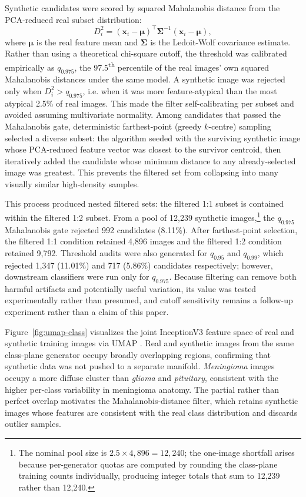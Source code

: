 \documentclass[conference,twoside]{IEEEtran}
\begin{document}
Synthetic candidates were scored by squared Mahalanobis distance from the PCA-reduced real subset distribution:
\begin{equation}
  D^2_i = (\mathbf{x}_i - \boldsymbol{\mu})^\top \boldsymbol{\Sigma}^{-1} (\mathbf{x}_i - \boldsymbol{\mu}),
\end{equation}
where $\boldsymbol{\mu}$ is the real feature mean and $\boldsymbol{\Sigma}$ is the Ledoit-Wolf covariance estimate. Rather than using a theoretical chi-square cutoff, the threshold was calibrated empirically as $q_{0.975}$, the 97.5\textsuperscript{th} percentile of the real images' own squared Mahalanobis distances under the same model. A synthetic image was rejected only when $D_i^2>q_{0.975}$, i.e. when it was more feature-atypical than the most atypical 2.5\% of real images. This made the filter self-calibrating per subset and avoided assuming multivariate normality. Among candidates that passed the Mahalanobis gate, deterministic farthest-point (greedy $k$-centre) sampling selected a diverse subset: the algorithm seeded with the surviving synthetic image whose PCA-reduced feature vector was closest to the survivor centroid, then iteratively added the candidate whose minimum distance to any already-selected image was greatest. This prevents the filtered set from collapsing into many visually similar high-density samples.

This process produced nested filtered sets: the filtered 1:1 subset is contained within the filtered 1:2 subset. From a pool of 12,239 synthetic images,\footnote{The nominal pool size is $2.5 \times 4{,}896 = 12{,}240$; the one-image shortfall arises because per-generator quotas are computed by rounding the class-plane training counts individually, producing integer totals that sum to 12,239 rather than 12,240.} the $q_{0.975}$ Mahalanobis gate rejected 992 candidates (8.11\%). After farthest-point selection, the filtered 1:1 condition retained 4,896 images and the filtered 1:2 condition retained 9,792. Threshold audits were also generated for $q_{0.95}$ and $q_{0.99}$, which rejected 1,347 (11.01\%) and 717 (5.86\%) candidates respectively; however, downstream classifiers were run only for $q_{0.975}$. Because filtering can remove both harmful artifacts and potentially useful variation, its value was tested experimentally rather than presumed, and cutoff sensitivity remains a follow-up experiment rather than a claim of this paper.

Figure~\ref{fig:umap-class} visualizes the joint InceptionV3 feature space of real and synthetic training images via UMAP \cite{mcinnes2018umap}. Real and synthetic images from the same class-plane generator occupy broadly overlapping regions, confirming that synthetic data was not pushed to a separate manifold. \textit{Meningioma} images occupy a more diffuse cluster than \textit{glioma} and \textit{pituitary}, consistent with the higher per-class variability in meningioma anatomy. The partial rather than perfect overlap motivates the Mahalanobis-distance filter, which retains synthetic images whose features are consistent with the real class distribution and discards outlier samples.
\end{document}
